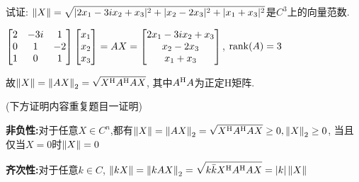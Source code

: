 \documentclass{matrix-homework}
\begin{document}
\section{}
试证: $\left\lVert X \right\rVert=\displaystyle\sqrt{|2x_1-3ix_2+x_3|^2 + |x_2-2x_3|^2 + |x_1+x_3|^2}$是$C^3$上的向量范数.

\answer
$\begin{bmatrix}2 & -3i & 1 \\ 0 & 1 & -2 \\ 1 & 0 & 1\end{bmatrix}\begin{bmatrix}x_1 \\ x_2 \\ x_3\end{bmatrix}=AX=\begin{bmatrix}2x_1-3ix_2+x_3 \\ x_2-2x_3 \\ x_1+x_3\end{bmatrix}$, $\mathrm{rank}(A)=3$

故$\left\lVert X \right\rVert=\left\lVert AX \right\rVert_2=\sqrt{X^{\mathrm{H}} A^{\mathrm{H}} AX}$, 其中$A^{\mathrm{H}} A$为正定H矩阵.

(下方证明内容重复题目一证明)

\textbf{非负性:}对于任意$X\in C^n$,都有$\left\lVert X \right\rVert=\left\lVert AX \right\rVert_2=\sqrt{X^{\mathrm{H}} A^{\mathrm{H}} AX} \ge0,\left\lVert X \right\rVert_2\ge0$, 当且仅当$X=0$时$\left\lVert X \right\rVert=0$

\textbf{齐次性:}对于任意$k\in C$, $\left\lVert kX \right\rVert=\left\lVert kAX \right\rVert_2= \displaystyle\sqrt{k\bar{k}X^{\mathrm{H}} A^{\mathrm{H}} AX}= |k|\left\lVert X \right\rVert$
\end{document}

